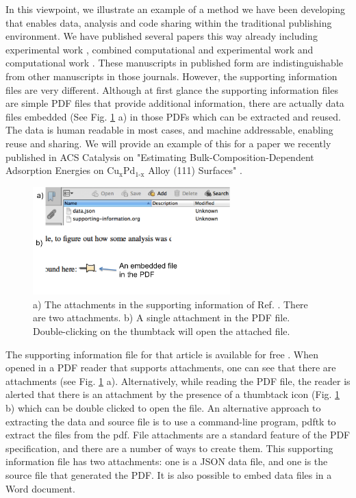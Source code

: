 \documentclass[journal=accacs,manuscript=article,email=true]{achemso}
\begin{document}
In this viewpoint, we illustrate an example of a method we have been developing that enables data, analysis and code sharing within the traditional publishing environment. We have published several papers this way already including experimental work \cite{hallenbeck-2013-effec-o2}, combined computational and experimental work \cite{miller-2014-simul-temper} and computational work \cite{curnan-2014-effec-concen,xu-2014-probin-cover,xu-2014-relat,mehta-2014-ident-poten}.  These manuscripts in published form are indistinguishable from other manuscripts in those journals. However, the supporting information files are very different. Although at first glance the supporting information files are simple PDF files that provide additional information, there are actually data files embedded (See Fig. \ref{fig-attachments} a) in those PDFs which can be extracted and reused. The data is human readable in most cases, and machine addressable, enabling reuse and sharing. We will provide an example of this for a paper we recently published in ACS Catalysis on "Estimating Bulk-Composition-Dependent  Adsorption Energies  on Cu$_{\text{x}}$Pd$_{\text{1-x}}$ Alloy (111) Surfaces" \cite{boes-2015-estim-bulk}.

\begin{figure}[H]
\centering
\includegraphics[width=3in]{embedded-attachments}
\caption{a) The attachments in the supporting information of Ref. . There are two attachments. b) A single attachment in the PDF file. Double-clicking on the thumbtack will open the attached file. \label{fig-attachments}}
\end{figure}

The supporting information file for that article is available for free \cite{boes-2015-estim-bulk-si}. When opened in a PDF reader that supports attachments, one can see that there are attachments (see Fig. \ref{fig-attachments} a). Alternatively, while reading the PDF file, the reader is alerted that there is an attachment by the presence of a thumbtack icon (Fig. \ref{fig-attachments} b) which can be double clicked to open the file. An alternative approach to extracting the data and source file is to use a command-line program, pdftk \cite{labs-pdftk} to extract the files from the pdf. File attachments are a standard feature of the PDF specification, and there are a number of ways to create them. This supporting information file has two attachments: one is a JSON data file, and one is the source file that generated the PDF. It is also possible to embed data files in a Word document.
\end{document}
